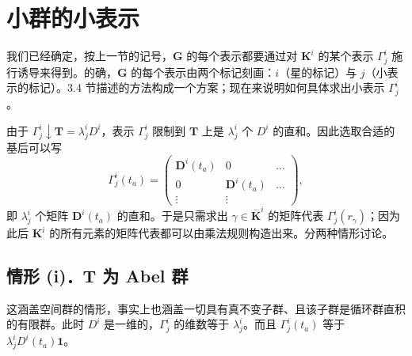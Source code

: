 \section{小群的小表示}

我们已经确定，按上一节的记号，$\mathbf{G}$ 的每个表示都要通过对 $\mathbf{K}^{i}$ 的某个表示 $\Gamma^{i}_{j}$ 施行诱导来得到。的确，$\mathbf{G}$ 的每个表示由两个标记刻画：$i$（星的标记）与 $j$（小表示的标记）。3.4 节描述的方法构成一个方案；现在来说明如何具体求出小表示 $\Gamma^{i}_{j}$。

由于 $\Gamma^{i}_{j} \downarrow \mathbf{T} = \lambda^{i}_{j}D^{i}$，表示 $\Gamma^{i}_{j}$ 限制到 $\mathbf{T}$ 上是 $\lambda^{i}_{j}$ 个 $D^{i}$ 的直和。因此选取合适的基后可以写
\begin{equation*}
\Gamma^{i}_{j}(t_{a}) = \begin{pmatrix} \mathbf{D}^{i}(t_{a}) & 0 & \dots\\ 0 & \mathbf{D}^{i}(t_{a}) & \dots\\ \vdots & \vdots \end{pmatrix},
\tag{4.4.1}
\end{equation*}
即 $\lambda^{i}_{j}$ 个矩阵 $\mathbf{D}^{i}(t_{a})$ 的直和。于是只需求出 $\gamma \in \overline{\mathbf{K}}^{i}$ 的矩阵代表 $\Gamma^{i}_{j}(r_{\gamma})$；因为此后 $\mathbf{K}^{i}$ 的所有元素的矩阵代表都可以由乘法规则构造出来。分两种情形讨论。

\subsection*{情形 (i)．$\mathbf{T}$ 为 Abel 群}

这涵盖空间群的情形，事实上也涵盖一切具有真不变子群、且该子群是循环群直积的有限群。此时 $D^{i}$ 是一维的，$\Gamma^{i}_{j}$ 的维数等于 $\lambda^{i}_{j}$。而且 $\Gamma^{i}_{j}(t_{a})$ 等于 $\lambda^{i}_{j}D^{i}(t_{a})\mathbf{1}$。

